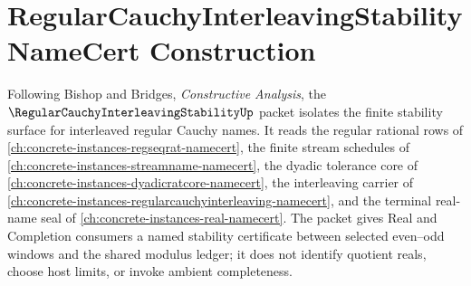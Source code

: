 \chapter{RegularCauchyInterleavingStability NameCert Construction}
\label{ch:concrete-instances-regular-cauchy-interleaving-stability-namecert}

Following Bishop and Bridges, \emph{Constructive Analysis}, the $\RegularCauchyInterleavingStabilityUp$ packet isolates the finite stability surface for interleaved regular Cauchy names. It reads the regular rational rows of \autoref{ch:concrete-instances-regseqrat-namecert}, the finite stream schedules of \autoref{ch:concrete-instances-streamname-namecert}, the dyadic tolerance core of \autoref{ch:concrete-instances-dyadicratcore-namecert}, the interleaving carrier of \autoref{ch:concrete-instances-regularcauchyinterleaving-namecert}, and the terminal real-name seal of \autoref{ch:concrete-instances-real-namecert}. The packet gives Real and Completion consumers a named stability certificate between selected even--odd windows and the shared modulus ledger; it does not identify quotient reals, choose host limits, or invoke ambient completeness.

